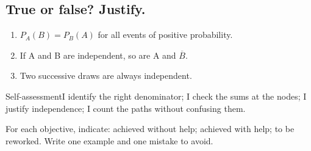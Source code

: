 \subsection*{True or false? Justify.}\label{C05-VF}
\begin{enumerate}
\item $P_A(B)=P_B(A)$ for all events of positive probability.
\item If A and B are independent, so are A and $\overline B$.
\item Two successive draws are always independent.
\end{enumerate}
\begin{repere}{Self-assessment}I identify the right denominator; I check the sums at the nodes; I justify independence; I count the paths without confusing them.

For each objective, indicate: achieved without help; achieved with help; to be reworked. Write one example and one mistake to avoid.\end{repere}
\endgroup
\ifprof\fi
